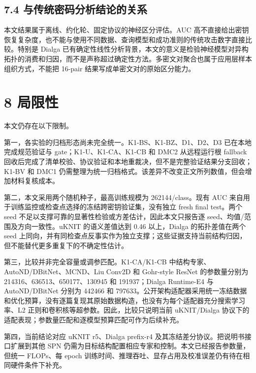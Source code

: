 \documentclass[
  a4paper,
  UTF8]{ctexart}
\begin{document}
\hypertarget{ux4e0eux4f20ux7edfux5bc6ux7801ux5206ux6790ux7ed3ux8bbaux7684ux5173ux7cfb}{%
\subsection{7.4
与传统密码分析结论的关系}\label{ux4e0eux4f20ux7edfux5bc6ux7801ux5206ux6790ux7ed3ux8bbaux7684ux5173ux7cfb}}

本文结果属于离线、约化轮、固定协议的神经区分评估。AUC
高不直接给出密钥恢复复杂度，也不能与使用不同数据、查询模型和成功准则的传统攻击数字直接比较。特别是
Dialga
已有确定性线性分析背景，本文的意义是检验神经模型对异构拓扑的消费和归因，而不是声称超过确定性方法。多密文对聚合也属于应用层样本组织方式，不能把
16-pair 结果写成单密文对的原始区分能力。

\hypertarget{ux5c40ux9650ux6027}{%
\section{8 局限性}\label{ux5c40ux9650ux6027}}

本文仍存在以下限制。

第一，各实验的归档形态尚未完全统一。K1-BS、K1-BZ、D1、D2、D3
已在本地完成规范验证与 gate；K1-U、K1-CA、K1-CB 和 DMC2
从远程运行根 fallback
回收后完成了清单校验、协议验证和本地重裁决，但不是完整验证结果分支回收；K1-BV
和 DMC1
仍需整理为统一归档格式。该差异不改变正文所列数值，但会增加材料复核成本。

第二，本文采用两个随机种子，最高训练规模为 262144/class。现有 AUC
来自用于训练监控或检查点选择的冻结跨密钥验证集，没有独立 fresh final
test。两个 seed 不足以支撑可靠的显著性检验或方差估计，因此本文只报告逐
seed、均值/范围及方向一致性。uKNIT 的语义差值达到 0.46 以上，Dialga
的拓扑差值在两个 seed
上同向，并有同检查点反事实作为独立支撑；这些证据支持当前结构归因，但不能替代更多重复下的不确定性估计。

第三，比较并非完全容量或调参匹配。K1-CA/K1-CB
中结构专家、AutoND/DBitNet、MCND、Liu Conv2D 和 Gohr-style ResNet
的参数量分别为 214316、636513、650177、130945 和 191937；Dialga
Runtime-E4 与 AutoND/DBitNet 分别为 442466 和
797633。公开架构适配器采用统一冻结数据和优化预算，没有逐篇复现其原始数据构造，也没有为每个适配器充分搜索学习率、L2
正则和卷积核等超参数。因此，比较只说明当前 uKNIT/Dialga
协议下的适配表现；参数量匹配和逐模型预算匹配可作为后续补充。

第四，当前结论对应 uKNIT r5、Dialga prefix-r4
及其冻结差分协议。把说明书接口扩展到其他 SPN
仍需为目标结构配置相应专家和控制。本文已经报告参数量，但统一 FLOPs、每
epoch 训练时间、推理吞吐、显存占用及校准误差仍有待在相同硬件条件下补充。
\end{document}
